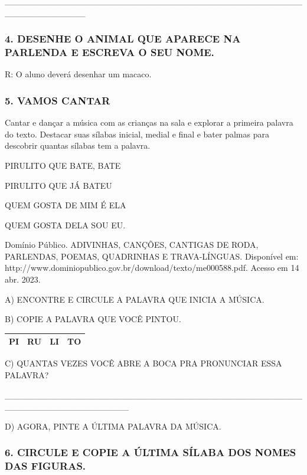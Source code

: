 \_\_\_\_\_\_\_\_\_\_\_\_\_\_\_\_\_\_\_\_\_\_\_\_\_\_\_\_\_\_\_\_\_\_\_\_\_\_\_\_\_\_\_\_\_\_\_\_\_\_\_\_\_\_\_\_\_\_\_\_\_

\subsubsection{4. DESENHE O ANIMAL QUE APARECE NA PARLENDA E ESCREVA O
SEU NOME.}\label{desenhe-o-animal-que-aparece-na-parlenda-e-escreva-o-seu-nome.}

R: O aluno deverá desenhar um macaco.

\subsubsection{5. VAMOS CANTAR}\label{vamos-cantar}

Cantar e dançar a música com as crianças na sala e explorar a primeira palavra do texto. Destacar suas sílabas inicial, medial e final e bater palmas para
descobrir quantas sílabas tem a palavra.

PIRULITO QUE BATE, BATE

PIRULITO QUE JÁ BATEU

QUEM GOSTA DE MIM É ELA

QUEM GOSTA DELA SOU EU.

Domínio Público. ADIVINHAS, CANÇÕES, CANTIGAS DE RODA, PARLENDAS, POEMAS, QUADRINHAS E TRAVA-LÍNGUAS. Disponível em: http://www.dominiopublico.gov.br/download/texto/me000588.pdf. Acesso em 14 abr. 2023.

A) ENCONTRE E CIRCULE A PALAVRA QUE INICIA A MÚSICA.

B) COPIE A PALAVRA QUE VOCÊ PINTOU.

\begin{longtable}[]{@{}llll@{}}
\toprule
\textbf{PI} & \textbf{RU} & \textbf{LI} & \textbf{TO}\tabularnewline
\bottomrule
\end{longtable}

C) QUANTAS VEZES VOCÊ ABRE A BOCA PRA PRONUNCIAR ESSA PALAVRA?

\_\_\_\_\_\_\_\_\_\_\_\_\_\_\_\_\_\_\_\_\_\_\_\_\_\_\_\_\_\_\_\_\_\_\_\_\_\_\_\_\_\_\_\_\_\_\_\_\_\_\_\_\_\_\_\_\_\_\_\_\_\_\_\_\_\_\_\_

D) AGORA, PINTE A ÚLTIMA PALAVRA DA MÚSICA.

\subsubsection{6. CIRCULE E COPIE A ÚLTIMA SÍLABA DOS NOMES DAS
FIGURAS.}\label{circule-e-copie-a-uxfaltima-suxedlaba-dos-nomes-das-figuras.}

